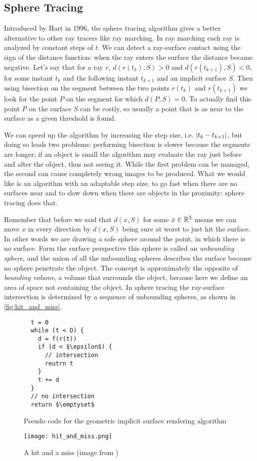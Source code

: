 \subsection{Sphere Tracing}
Introduced by Hart\cite{hart1996} in 1996, the sphere tracing algorithm gives a better alternative to other ray tracers like ray marching.
In ray marching each ray is analyzed by constant steps of $t$.
We can detect a ray-surface contact using the sign of the distance function: when the ray enters the surface the distance became negative.
Let's say that for a ray $r$, $d(r(t_k),S) > 0$ and $d(r(t_{k+1}),S) < 0$, for some instant $t_k$ and the following instant $t_{k+1}$ and an implicit surface $S$.
Then using bisection on the segment between the two points $r(t_k)$ and $r(t_{k+1})$
we look for the point $P$ on the segment for which $d(P,S) = 0$.
To actually find this point $P$ on the surface $S$ can be costly, so usually a point that is as near to the surface as a given threshold is found.

We can speed up the algorithm by increasing the step size, i.e. $\lvert t_{k} - t_{k+1} \lvert$, but doing so leads two problems:
performing bisection is slower because the segments are longer;
if an object is small the algorithm may evaluate the ray just before and after the object, thus not seeing it.
While the first problem can be managed, the second can cause completely wrong images to be produced.
What we would like is an algorithm with an adaptable step size, to go fast when there are no surfaces near and to slow down when there are objects in the proximity: sphere tracing does that.

Remember that before we said that $d(x,S)$ for some $x \in \mathbb{R}^3$ means we can move $x$ in every direction by $d(x,S)$ being sure at worst to just hit the surface.
In other words we are drawing a safe sphere around the point, in which there is no surface.
Form the surface perspective this sphere is called an \emph{unbounding sphere}\cite{hart1996}, and the union of all the unbounding spheres describes the surface because no sphere penetrate the object.
The concept is approximately the opposite of \emph{bounding volume}, a volume that surrounds the object, because here we define an area of space not containing the object.
In sphere tracing the ray-surface intersection is determined by a sequence of unbounding spheres, as shown in \autoref{fig:hit_and_miss}.
\begin{figure}[!htb]
  \begin{lstlisting}
  t = 0
  while (t < D) {
    d = f(r(t))
    if (d < $\epsilon$) {
      // intersection
      reutrn t
    }
    t += d
  }
  // no intersection
  return $\emptyset$
  \end{lstlisting}
  \caption{Pseudo code for the geometric implicit surface rendering algorithm}
  \label{pscode:sphere_tracing}
\endminipage\hfill
{}
  \texttt{[image: hit\_and\_miss.png]}
  \caption{A hit and a miss (image from \cite{hart1996})}
  \label{fig:hit_and_miss}
\endminipage
\end{figure}

